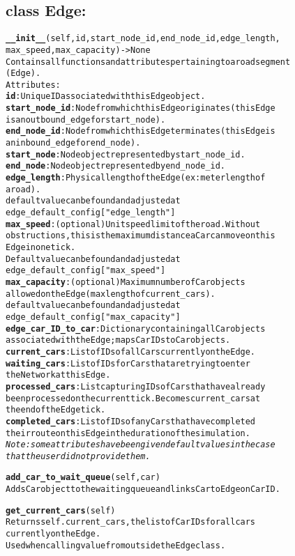 \subsection{class Edge:}
\begin{alltt}

\textbf{__init__}(self, id, start_node_id, end_node_id, edge_length,
max_speed, max_capacity) -> None
Contains all functions and attributes pertaining to a road segment 
(Edge).
Attributes:
    \textbf{id}:  Unique ID associated with this Edge object.
    \textbf{start_node_id}:  Node from which this Edge originates (this Edge 
    is an outbound_edge for start_node).
    \textbf{end_node_id}:  Node from which this Edge terminates (this Edge is 
    an inbound_edge for end_node).
    \textbf{start_node}:  Node object represented by start_node_id.
    \textbf{end_node}:  Node object represented by end_node_id.
    \textbf{edge_length}:  Physical length of the Edge (ex: meter length of 
    a road).
        default value can be found and adjusted at
        edge_default_config["edge_length"]
    \textbf{max_speed}:  (optional) Unit speed limit of the road.  Without
    obstructions, this is the maximum distance a Car can move on this 
    Edge in one tick.
        Default value can be found and adjusted at
        edge_default_config["max_speed"]
    \textbf{max_capacity}:  (optional) Maximum number of Car objects
    allowed on the Edge (max length of current_cars).
        default value can be found and adjusted at
        edge_default_config["max_capacity"]
    \textbf{edge_car_ID_to_car}:  Dictionary containing all Car objects
    associated with the Edge; maps Car IDs to Car objects.
    \textbf{current_cars}:  List of IDs of all Cars currently on the Edge.
    \textbf{waiting_cars}:  List of IDs for Cars that are trying to enter
    the Network at this Edge.
    \textbf{processed_cars}:  List capturing IDs of Cars that have already
    been processed on the current tick.  Becomes current_cars at 
    the end of the Edge tick.
    \textbf{completed_cars}:  List of IDs of any Cars that have completed
    their route on this Edge in the duration of the simulation.
\textit{Note:  some attributes have been given default values in the case
that the user did not provide them.}

\textbf{add_car_to_wait_queue}(self, car)
Adds Car object to the waiting queue and links Car to Edge on Car ID.

\textbf{get_current_cars}(self)
Returns self.current_cars, the list of Car IDs for all cars 
currently on the Edge.
Used when calling value from outside the Edge class.


\end{alltt}
